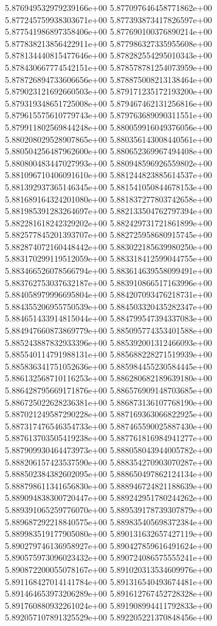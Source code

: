 5.876949532979239166e+00
5.877097646458771862e+00
5.877245759938303671e+00
5.877393873417826597e+00
5.877541986897358406e+00
5.877690100376890214e+00
5.877838213856422911e+00
5.877986327335955608e+00
5.878134440815477646e+00
5.878282554295010343e+00
5.878430667774542151e+00
5.878578781254073959e+00
5.878726894733606656e+00
5.878875008213138464e+00
5.879023121692660503e+00
5.879171235172193200e+00
5.879319348651725008e+00
5.879467462131256816e+00
5.879615575610779743e+00
5.879763689090311551e+00
5.879911802569844248e+00
5.880059916049376056e+00
5.880208029528907865e+00
5.880356143008440561e+00
5.880504256487962600e+00
5.880652369967494408e+00
5.880800483447027993e+00
5.880948596926559802e+00
5.881096710406091610e+00
5.881244823885614537e+00
5.881392937365146345e+00
5.881541050844678153e+00
5.881689164324201080e+00
5.881837277803742658e+00
5.881985391283264697e+00
5.882133504762797394e+00
5.882281618242329202e+00
5.882429731721861899e+00
5.882577845201393707e+00
5.882725958680915745e+00
5.882874072160448442e+00
5.883022185639980250e+00
5.883170299119512059e+00
5.883318412599044755e+00
5.883466526078566794e+00
5.883614639558099491e+00
5.883762753037632187e+00
5.883910866517163996e+00
5.884058979996695804e+00
5.884207093476218731e+00
5.884355206955750539e+00
5.884503320435282347e+00
5.884651433914815044e+00
5.884799547394337083e+00
5.884947660873869779e+00
5.885095774353401588e+00
5.885243887832933396e+00
5.885392001312466093e+00
5.885540114791988131e+00
5.885688228271519939e+00
5.885836341751052636e+00
5.885984455230584445e+00
5.886132568710116253e+00
5.886280682189639180e+00
5.886428795669171876e+00
5.886576909148703685e+00
5.886725022628236381e+00
5.886873136107768190e+00
5.887021249587290228e+00
5.887169363066822925e+00
5.887317476546354733e+00
5.887465590025887430e+00
5.887613703505419238e+00
5.887761816984941277e+00
5.887909930464473973e+00
5.888058043944005782e+00
5.888206157423537590e+00
5.888354270903070287e+00
5.888502384382602095e+00
5.888650497862124134e+00
5.888798611341656830e+00
5.888946724821188639e+00
5.889094838300720447e+00
5.889242951780244262e+00
5.889391065259776070e+00
5.889539178739307879e+00
5.889687292218840575e+00
5.889835405698372384e+00
5.889983519177905080e+00
5.890131632657427119e+00
5.890279746136958927e+00
5.890427859616491624e+00
5.890575973096023432e+00
5.890724086575555241e+00
5.890872200055078167e+00
5.891020313534609976e+00
5.891168427014141784e+00
5.891316540493674481e+00
5.891464653973206289e+00
5.891612767452728328e+00
5.891760880932261024e+00
5.891908994411792833e+00
5.892057107891325529e+00
5.892205221370848456e+00
